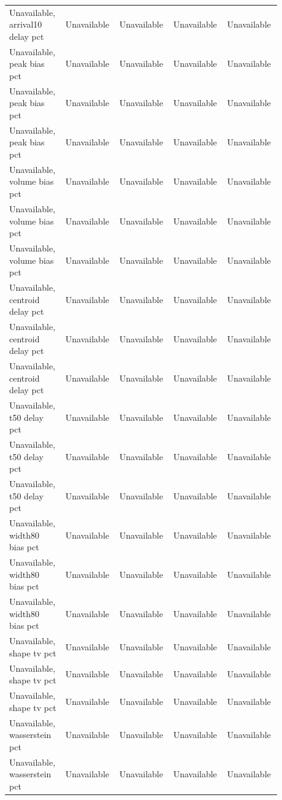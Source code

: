 \begin{longtable}{p{0.1760\linewidth}p{0.1760\linewidth}p{0.1760\linewidth}p{0.1760\linewidth}p{0.1760\linewidth}}
Unavailable, arrival10 delay pct & Unavailable & Unavailable & Unavailable & Unavailable \\
Unavailable, peak bias pct & Unavailable & Unavailable & Unavailable & Unavailable \\
Unavailable, peak bias pct & Unavailable & Unavailable & Unavailable & Unavailable \\
Unavailable, peak bias pct & Unavailable & Unavailable & Unavailable & Unavailable \\
Unavailable, volume bias pct & Unavailable & Unavailable & Unavailable & Unavailable \\
Unavailable, volume bias pct & Unavailable & Unavailable & Unavailable & Unavailable \\
Unavailable, volume bias pct & Unavailable & Unavailable & Unavailable & Unavailable \\
Unavailable, centroid delay pct & Unavailable & Unavailable & Unavailable & Unavailable \\
Unavailable, centroid delay pct & Unavailable & Unavailable & Unavailable & Unavailable \\
Unavailable, centroid delay pct & Unavailable & Unavailable & Unavailable & Unavailable \\
Unavailable, t50 delay pct & Unavailable & Unavailable & Unavailable & Unavailable \\
Unavailable, t50 delay pct & Unavailable & Unavailable & Unavailable & Unavailable \\
Unavailable, t50 delay pct & Unavailable & Unavailable & Unavailable & Unavailable \\
Unavailable, width80 bias pct & Unavailable & Unavailable & Unavailable & Unavailable \\
Unavailable, width80 bias pct & Unavailable & Unavailable & Unavailable & Unavailable \\
Unavailable, width80 bias pct & Unavailable & Unavailable & Unavailable & Unavailable \\
Unavailable, shape tv pct & Unavailable & Unavailable & Unavailable & Unavailable \\
Unavailable, shape tv pct & Unavailable & Unavailable & Unavailable & Unavailable \\
Unavailable, shape tv pct & Unavailable & Unavailable & Unavailable & Unavailable \\
Unavailable, wasserstein pct & Unavailable & Unavailable & Unavailable & Unavailable \\
Unavailable, wasserstein pct & Unavailable & Unavailable & Unavailable & Unavailable \\

\end{longtable}
